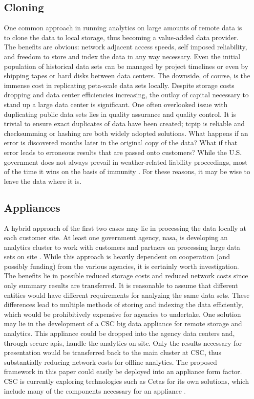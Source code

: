 \subsection{Cloning}
One common approach in running analytics on large amounts of remote data is to clone the data to local storage, thus becoming a value-added data provider. The benefits are obvious: network adjacent access speeds, self imposed reliability, and freedom to store and index the data in any way necessary. Even the initial population of historical data sets can be managed by project timelines or even by shipping tapes or hard disks between data centers. The downside, of course, is the immense cost in replicating peta-scale data sets locally. Despite storage costs dropping and data center efficiencies increasing, the outlay of capital necessary to stand up a large data center is significant. One often overlooked issue with duplicating public data sets lies in quality assurance and quality control. It is trivial to ensure exact duplicates of data have been created; \gls{tcpip} is reliable and checksumming or hashing are both widely adopted solutions. What happens if an error is discovered months later in the original copy of the data? What if that error leads to erroneous results that are passed onto customers?  While the U.S. government does not always prevail in weather-related liability proceedings, most of the time it wins on the basis of immunity \cite[Chapter~4]{fairweather}. For these reasons, it may be wise to leave the data where it is.
\subsection{Appliances}
A hybrid approach of the first two cases may lie in processing the data locally at each customer site. At least one government agency, \gls{nasa}, is developing an analytics cluster to work with customers and partners on processing large data sets on site \cite{duffy}. While this approach is heavily dependent on cooperation (and possibly funding) from the various agencies, it is certainly worth investigation. The benefits lie in possible reduced storage costs and reduced network costs since only summary results are transferred. It is reasonable to assume that different entities would have different requirements for analyzing the same data sets. These differences lead to multiple methods of storing and indexing the data efficiently, which would be prohibitively expensive for agencies to undertake.  One solution may lie in the development of a \textsc{CSC} big data appliance for remote storage and analytics. This appliance could be dropped into the agency data centers and, through secure \gls{api}s, handle the analytics on site. Only the results necessary for presentation would be transferred back to the main cluster at \textsc{CSC}, thus substantially reducing network costs for offline analytics. The proposed framework in this paper could easily be deployed into an appliance form factor. \textsc{CSC} is currently exploring technologies such as Cetas for its own solutions, which include many of the components necessary for an appliance \cite{cetas}.\\

